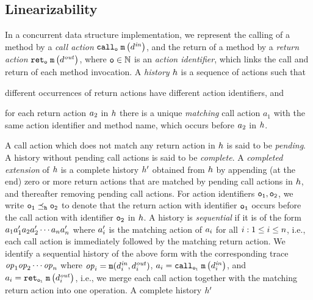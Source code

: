 \subsection{Linearizability}
In a concurrent
data structure implementation, we represent the calling of a method by
a {\it call action} $\mathtt{call}_{\tt o}\; {\tt m}\left(d^{\it in}\right)$, and the return of a method by
a {\it return action} $\mathtt{ret}_{\tt o}\; {\tt m}\left(d^{\it out}\right)$, where $\tt o\in\mathbb{N}$ is an
{\it action identifier}, which links the call and return of each method invocation.
%
A {\it history} $h$ is a sequence of actions such that
\begin{inparaenum}[(i)]
\item
  different occurrences of return actions have different action identifiers, and
\item
  for each return action $a_2$ in $h$ there is a unique
{\it matching}  call action $a_1$ with the same action identifier and method name, which occurs before $a_2$ in $h$.
\end{inparaenum}
%
A call action which does not match any return action in $h$ is said
to be {\em pending}.
A history without pending call actions is said to be {\em complete}.
A {\em completed extension} of $h$ is a complete history
$h'$ obtained from $h$ by
  appending (at the end) zero or more return actions that are matched by
  pending call actions in $h$, and
  thereafter removing pending call actions.
%
For action identifiers $\tt o_1,\tt o_2$, we write
$\tt o_1\preceq_{h}\tt o_2$ to denote that
the return action with identifier $\tt o_1$ occurs before
the call action with identifier $\tt o_2$ in $h$.
A history is {\it sequential} if it is of the form
$a_1a'_1a_2a'_2\cdots a_na'_n$
where $a'_i$ is the matching action of $a_i$ 
for all $i:1\leq i\leq n$, i.e., each call action 
is immediately followed by the matching return action. 
%
We identify a sequential history of the above form with
the corresponding trace 
${\it op}_1{\it op}_2\cdots{\it op}_n$ where
${\it op}_i={\tt m}(d^{\it in}_i,d^{\it out}_i)$,
$a_i=\mathtt{call}_{\tt o_i}\; {\tt m}\left(d^{\it in}_{i}\right)$, and
$a_i=\mathtt{ret}_{\tt o_i}\; {\tt m}\left(d^{\it out}_{i}\right)$,
i.e., we merge each call action together with the matching return action
into one operation.
%
A complete history $h'$ 
